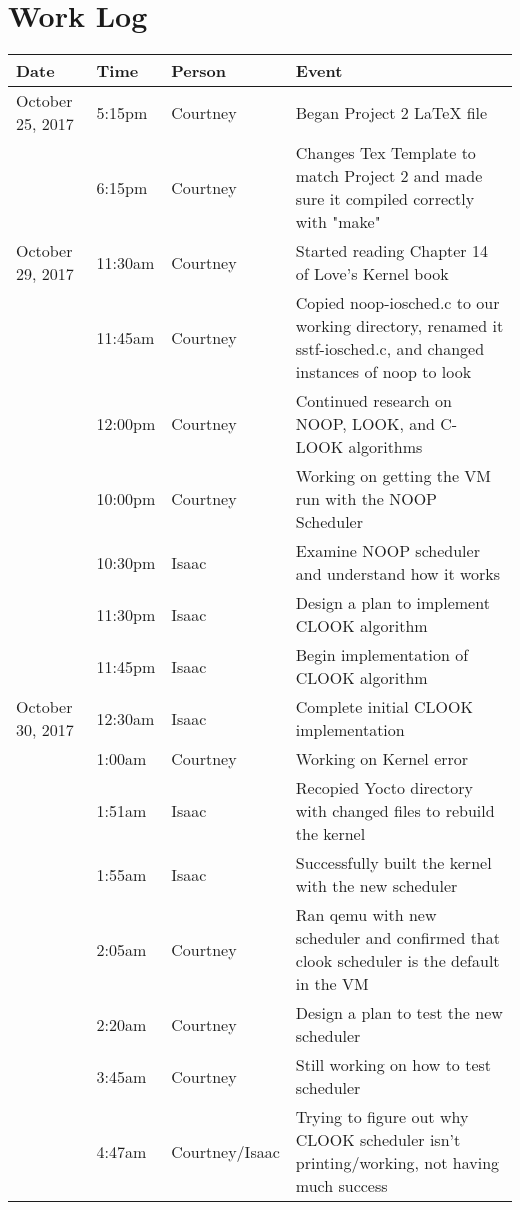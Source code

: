 \documentclass[letterpaper,10pt,draftclsnofoot,onecolumn,titlepage]{IEEEtran}
\begin{document}
\section{Work Log}
\begin{center}
\begin{tabular}{p{3cm}p{1cm}p{1cm}p{10cm} }
 Date  & Time & Person & Event \\ \hline
October 25, 2017 & 5:15pm & Courtney & Began Project 2 LaTeX file \\
		 & 6:15pm & Courtney & Changes Tex Template to match Project 2 and made sure it compiled correctly with "make" \\
October 29, 2017 & 11:30am & Courtney & Started reading Chapter 14 of Love's Kernel book \\                 
		 & 11:45am & Courtney & Copied noop-iosched.c to our working directory, renamed it sstf-iosched.c, and changed instances of noop to look \\ 
		 & 12:00pm & Courtney & Continued research on NOOP, LOOK, and C-LOOK algorithms \\
		 & 10:00pm & Courtney & Working on getting the VM run with the NOOP Scheduler \\
   		 & 10:30pm & Isaac & Examine NOOP scheduler and understand how it works \\
   		 & 11:30pm & Isaac & Design a plan to implement CLOOK algorithm \\
   		 & 11:45pm & Isaac & Begin implementation of CLOOK algorithm \\
October 30, 2017 & 12:30am & Isaac & Complete initial CLOOK implementation \\
		 & 1:00am & Courtney & Working on Kernel error \\
		 & 1:51am & Isaac & Recopied Yocto directory with changed files to rebuild the kernel \\
		 & 1:55am & Isaac & Successfully built the kernel with the new scheduler \\
		 & 2:05am & Courtney & Ran qemu with new scheduler and confirmed that clook scheduler is the default in the VM \\
   		 & 2:20am & Courtney & Design a plan to test the new scheduler \\
		 & 3:45am & Courtney & Still working on how to test scheduler \\
		 & 4:47am & Courtney/Isaac & Trying to figure out why CLOOK scheduler isn't printing/working, not having much success \\
\end{tabular}
\end{center}
\end{document}
